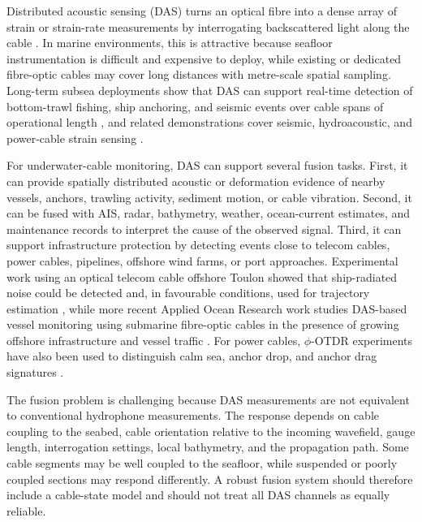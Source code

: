 \documentclass{ieeeaccess}
\begin{document}
Distributed acoustic sensing (DAS) turns an optical fibre into a dense array of strain or strain-rate measurements by interrogating backscattered light along the cable \cite{hartog_intro_2017,lu_distributed_2019,lindsey_fiberoptic_2021}. In marine environments, this is attractive because seafloor instrumentation is difficult and expensive to deploy, while existing or dedicated fibre-optic cables may cover long distances with metre-scale spatial sampling. Long-term subsea deployments show that DAS can support real-time detection of bottom-trawl fishing, ship anchoring, and seismic events over cable spans of operational length \cite{waagaard_longterm_2022}, and related demonstrations cover seismic, hydroacoustic, and power-cable strain sensing \cite{williams_distributed_2019,matsumoto_hydroacoustic_2021,masoudi_dynamic_2018}.

For underwater-cable monitoring, DAS can support several fusion tasks. First, it can provide spatially distributed acoustic or deformation evidence of nearby vessels, anchors, trawling activity, sediment motion, or cable vibration. Second, it can be fused with AIS, radar, bathymetry, weather, ocean-current estimates, and maintenance records to interpret the cause of the observed signal. Third, it can support infrastructure protection by detecting events close to telecom cables, power cables, pipelines, offshore wind farms, or port approaches. Experimental work using an optical telecom cable offshore Toulon showed that ship-radiated noise could be detected and, in favourable conditions, used for trajectory estimation \cite{rivet_ship_2021}, while more recent Applied Ocean Research work studies DAS-based vessel monitoring using submarine fibre-optic cables in the presence of growing offshore infrastructure and vessel traffic \cite{paap_vessel_2025}. For power cables, \(\phi\)-OTDR experiments have also been used to distinguish calm sea, anchor drop, and anchor drag signatures \cite{lv_otdr_2018}.

The fusion problem is challenging because DAS measurements are not equivalent to conventional hydrophone measurements. The response depends on cable coupling to the seabed, cable orientation relative to the incoming wavefield, gauge length, interrogation settings, local bathymetry, and the propagation path. Some cable segments may be well coupled to the seafloor, while suspended or poorly coupled sections may respond differently. A robust fusion system should therefore include a cable-state model and should not treat all DAS channels as equally reliable.
\end{document}

